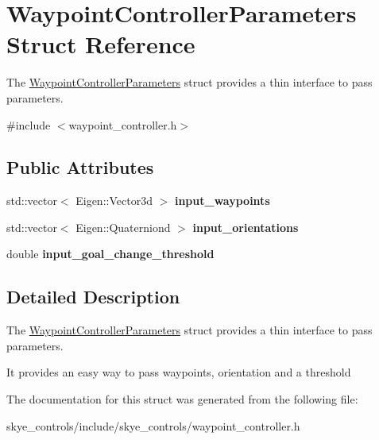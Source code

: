 \hypertarget{struct_waypoint_controller_parameters}{\section{Waypoint\-Controller\-Parameters Struct Reference}
\label{struct_waypoint_controller_parameters}
}


The \hyperlink{struct_waypoint_controller_parameters}{Waypoint\-Controller\-Parameters} struct provides a thin interface to pass parameters.  




{\ttfamily \#include $<$waypoint\-\_\-controller.\-h$>$}

\subsection*{Public Attributes}
\begin{DoxyCompactItemize}
\item 
\hypertarget{struct_waypoint_controller_parameters_a0d82272b89f3d64dc3a157d448e7ab50}{std\-::vector$<$ Eigen\-::\-Vector3d $>$ {\bfseries input\-\_\-waypoints}}\label{struct_waypoint_controller_parameters_a0d82272b89f3d64dc3a157d448e7ab50}

\item 
\hypertarget{struct_waypoint_controller_parameters_a1d07718cf75a62d9e1e7d733620fe980}{std\-::vector$<$ Eigen\-::\-Quaterniond $>$ {\bfseries input\-\_\-orientations}}\label{struct_waypoint_controller_parameters_a1d07718cf75a62d9e1e7d733620fe980}

\item 
\hypertarget{struct_waypoint_controller_parameters_aeb594da1a72b35a2b75b38343c08c5e6}{double {\bfseries input\-\_\-goal\-\_\-change\-\_\-threshold}}\label{struct_waypoint_controller_parameters_aeb594da1a72b35a2b75b38343c08c5e6}

\end{DoxyCompactItemize}


\subsection{Detailed Description}
The \hyperlink{struct_waypoint_controller_parameters}{Waypoint\-Controller\-Parameters} struct provides a thin interface to pass parameters. 

It provides an easy way to pass waypoints, orientation and a threshold 

The documentation for this struct was generated from the following file\-:\begin{DoxyCompactItemize}
\item 
skye\-\_\-controls/include/skye\-\_\-controls/waypoint\-\_\-controller.\-h\end{DoxyCompactItemize}
